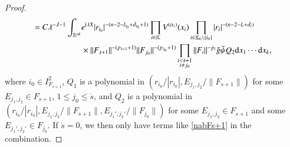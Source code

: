 \documentclass[11pt,reqno]{amsart}
\def\d{{\rm d}}
\def\i{{\rm i}}
\numberwithin{equation}{section}
\theoremstyle{definition}
\begin{document}
\begin{proof}
\begin{equation}
\begin{split}
			=C\lambda^{-\dot{J}-1}\int_{\mathbb{R}^{nk}}&e^{\mathrm{i}\lambda X}|r_{i_0}|^{-(n-2-l_{i_0}+\dot{d}_{i_0}+1)}\prod_{i\in\mathbb{K}}V^{(\dot{\alpha}_i)}(x_i)\prod_{i\in\mathbb{K}_0\setminus\{i_0\}}|r_i|^{-(n-2-l_i+\dot{d}_i)}\\
			&\times\|F_{\dot{s}+1}\|^{-(\dot{p}_{\dot{s}+1}+1)}\|F_{j_0}\|^{-(\dot{p}_{j_0}+1)}\prod_{\substack{i<\dot{s}+1\\i\neq j_0}}\|F_i\|^{-{\dot{p}_i}}\tilde{g}\tilde{\psi}Q_2 \d x_1\cdots \d x_k,
		\end{split}
	\end{equation}
	where $i_0\in I_{F_{\dot{s}+1}}^2$, $Q_1$ is a polynomial in $(r_{i_0}/|r_{i_0}|,E_{j_1,j_2}/\|F_{\dot{s}+1}\|)$ for some $E_{j_1,j_2}\in F_{\dot{s}+1}$, $1\leq j_0\leq\dot{s}$, and $Q_2$ is a polynomial in $(r_{i_0}/|r_{i_0}|,E_{j_1,j_2}/\|F_{\dot{s}+1}\|,E_{j_1',j_2'}/\|F_{j_0}\|)$ for some $E_{j_1,j_2}\in F_{\dot{s}+1}$ and some $E_{j_1',j_2'}\in F_{j_0}$. If $\dot{s}=0$, we then only have terms like \eqref{nabFs+1} in the combination.
	

\end{proof}
\end{document}
